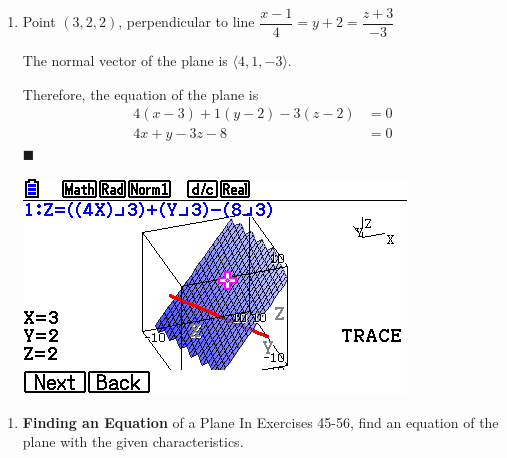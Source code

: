 \begin{enumerate}
    \item Point $(3, 2, 2)$, perpendicular to line $\dfrac{x-1}{4}=y+2=\dfrac{z+3}{-3}$

          \sol{} The normal vector of the plane is $\langle 4, 1, -3 \rangle$.

          Therefore, the equation of the plane is
          \begin{align*}
              4(x - 3) + 1(y - 2) - 3(z - 2) & = 0 \\
              4x + y - 3z - 8                & = 0
          \end{align*} \hfill $\blacksquare$
          \begin{center}
              \includegraphics[scale=0.5]{assets/larson11.5q44graph.png}
          \end{center}

          \newpage
\end{enumerate}

\begin{enumerate}[label={},leftmargin=*]
    \item \textbf{Finding an Equation} of a Plane In Exercises 45-56, find an equation of the plane with the given characteristics.
\end{enumerate}

